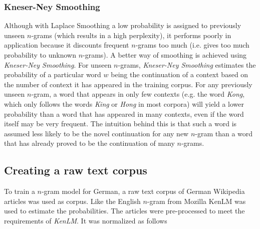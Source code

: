 \subsubsection{Kneser-Ney Smoothing}

Although with Laplace Smoothing a low probability is assigned to previously unseen $n$-grams (which results in a high perplexity), it performs poorly in application because it discounts frequent $n$-grams too much (i.e. gives too much probability to unknown $n$-grams). A better way of smoothing is achieved using \textit{Kneser-Ney Smoothing}. For unseen $n$-grams, \textit{Kneser-Ney Smoothing} estimates the probability of a particular word $w$ being the continuation of a context based on the number of context it has appeared in the training corpus. For any previously unseen $n$-gram, a word that appears in only few contexts (e.g. the word \textit{Kong}, which only follows the words \textit{King} or \textit{Hong} in most corpora) will yield a lower probability than a word that has appeared in many contexts, even if the word itself may be very frequent. The intuition behind this is that such a word is assumed less likely to be the novel continuation for any new $n$-gram than a word that has already proved to be the continuation of many $n$-grams.

\subsection{Creating a raw text corpus}

To train a $n$-gram model for German, a raw text corpus of German Wikipedia articles was used as corpus. Like the English $n$-gram from Mozilla KenLM \parencite{kenlm} was used to estimate the probabilities. The articles were pre-processed to meet the requirements of \textit{KenLM}. It was normalized as follows 

